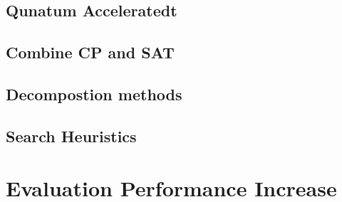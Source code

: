   
\subsection{Qunatum Acceleratedt}
\label{sec:Qunatum Accelerated}

  
\subsection{Combine CP and SAT}
\label{sec:Combine CP and SAT}

  
\subsection{Decompostion methods}
\label{sec:Decompostion methods}

  
\subsection{Search Heuristics}
\label{sec:Search Heuristics}


\section{Evaluation Performance Increase}
\label{sec:Evaluation Performance Increase}





\printbibliography[heading=bibintoc]





